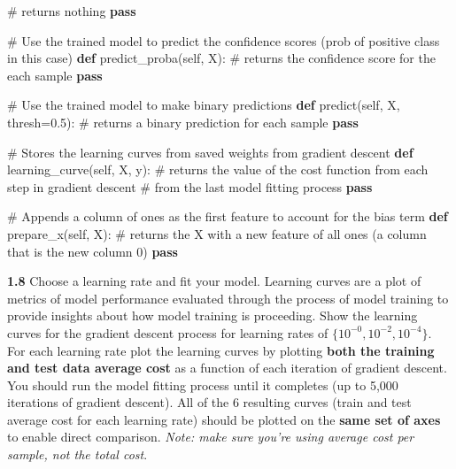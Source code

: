 \documentclass[
  letterpaper,
  DIV=11,
  numbers=noendperiod]{scrartcl}
\newenvironment{Shaded}{\begin{snugshade}}{\end{snugshade}}
\newcommand{\CommentTok}[1]{\textcolor[rgb]{0.37,0.37,0.37}{#1}}
\newcommand{\ControlFlowTok}[1]{\textcolor[rgb]{0.00,0.23,0.31}{\textbf{#1}}}
\newcommand{\FloatTok}[1]{\textcolor[rgb]{0.68,0.00,0.00}{#1}}
\newcommand{\KeywordTok}[1]{\textcolor[rgb]{0.00,0.23,0.31}{\textbf{#1}}}
\newcommand{\NormalTok}[1]{\textcolor[rgb]{0.00,0.23,0.31}{#1}}
\newcommand{\OperatorTok}[1]{\textcolor[rgb]{0.37,0.37,0.37}{#1}}
\newcommand{\VariableTok}[1]{\textcolor[rgb]{0.07,0.07,0.07}{#1}}
\begin{document}
\begin{Shaded}
\begin{Highlighting}[]
        \CommentTok{\# returns nothing}
        \ControlFlowTok{pass}
    
    \CommentTok{\# Use the trained model to predict the confidence scores (prob of positive class in this case)}
    \KeywordTok{def}\NormalTok{ predict\_proba(}\VariableTok{self}\NormalTok{, X):}
        \CommentTok{\# returns the confidence score for the each sample}
        \ControlFlowTok{pass}
    
    \CommentTok{\# Use the trained model to make binary predictions}
    \KeywordTok{def}\NormalTok{ predict(}\VariableTok{self}\NormalTok{, X, thresh}\OperatorTok{=}\FloatTok{0.5}\NormalTok{):}
        \CommentTok{\# returns a binary prediction for each sample}
        \ControlFlowTok{pass}
    
    \CommentTok{\# Stores the learning curves from saved weights from gradient descent}
    \KeywordTok{def}\NormalTok{ learning\_curve(}\VariableTok{self}\NormalTok{, X, y):}
        \CommentTok{\# returns the value of the cost function from each step in gradient descent}
        \CommentTok{\#  from the last model fitting process}
        \ControlFlowTok{pass}
    
    \CommentTok{\# Appends a column of ones as the first feature to account for the bias term}
    \KeywordTok{def}\NormalTok{ prepare\_x(}\VariableTok{self}\NormalTok{, X):}
        \CommentTok{\# returns the X with a new feature of all ones (a column that is the new column 0)}
        \ControlFlowTok{pass}
\end{Highlighting}
\end{Shaded}

\textbf{1.8} Choose a learning rate and fit your model. Learning curves
are a plot of metrics of model performance evaluated through the process
of model training to provide insights about how model training is
proceeding. Show the learning curves for the gradient descent process
for learning rates of \(\{10^{-0}, 10^{-2}, 10^{-4}\}\). For each
learning rate plot the learning curves by plotting \textbf{both the
training and test data average cost} as a function of each iteration of
gradient descent. You should run the model fitting process until it
completes (up to 5,000 iterations of gradient descent). All of the 6
resulting curves (train and test average cost for each learning rate)
should be plotted on the \textbf{same set of axes} to enable direct
comparison. \emph{Note: make sure you're using average cost per sample,
not the total cost}.
\end{document}

